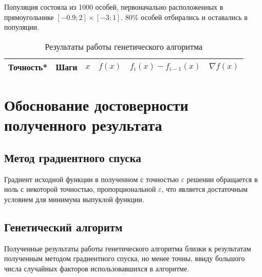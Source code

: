 \documentclass[10pt,a4paper,titlepage]{article}
\begin{document}
Популяция состояла из 1000 особей, первоначально расположенных в прямоугольнике $[-0.9; 2] \times [-3; 1].$
80\% особей отбирались и оставались в популяции.

\begin{table}[H]
\caption{Результаты работы генетического алгоритма}
\label{gen-result-table}
\begin{center}
\begin{tabular}{|c|c|c|c|c|c|}
\hline
Точность* & Шаги & $x$ & $f(x)$ & $f_i(x) - f_{i - 1}(x)$ & $\nabla f(x)$ \\
\hline

\hline
\end{tabular}
\end{center}
\end{table}



\section{Обоснование достоверности полученного результата}
\subsection{Метод градиентного спуска}
Градиент исходной функции в полученном с точностью $\varepsilon$ решении обращается в ноль с некоторой точностью, 
пропорциональной $\varepsilon$, что является достаточным условием для минимума выпуклой функции.

\subsection{Генетический алгоритм}
Полученные результаты работы генетического алгоритма близки к результатам полученным методом градиентного спуска, 
но менее точны, ввиду большого числа случайных факторов использовавшихся в алгоритме.
\end{document}
